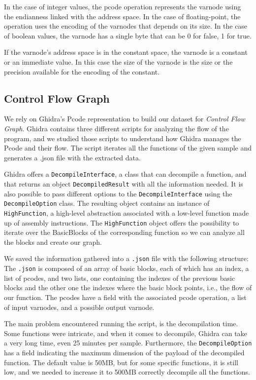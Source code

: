 In the case of integer values, the pcode operation represents the varnode using the endianness linked with the address space.
In the case of floating-point, the operation uses the encoding of the varnodes that depends on its size.
In the case of boolean values, the varnode has a single byte that can be 0 for false, 1 for true.

If the varnode's address space is in the constant space, the varnode is a constant or an immediate value. In this case the size of the varnode is the size or the precision available for the encoding of the constant.



\subsection{Control Flow Graph}
\label{subsec:cfg_ghidra}
We rely on Ghidra's Pcode representation to build our dataset for \textit{Control Flow Graph}. Ghidra contains three different scripts for analyzing the flow of the program, and we studied those scripts to understand how Ghidra manages the Pcode and their flow. The script iterates all the functions of the given sample and generates a .json file with the extracted data.

Ghidra offers a \texttt{DecompileInterface}, a class that can decompile a function, and that returns an object \texttt{DecompiledResult} with all the information needed. It is also possible to pass different options to the \texttt{DecompileInterface} using the \texttt{DecompileOption} class. The resulting object contains an instance of \texttt{HighFunction}, a high-level abstraction associated with a low-level function made up of assembly instructions. The \texttt{HighFunction} object offers the possibility to iterate over the BasicBlocks of the corresponding function so we can analyze all the blocks and create our graph.

We saved the information gathered into a \texttt{.json} file with the following structure:
The \texttt{.json} is composed of an array of basic blocks, each of which has an index, a list of pcodes, and two lists, one containing the indexes of the previous basic blocks and the other one the indexes where the basic block points, i.e., the flow of our function. The pcodes have a field with the associated pcode operation, a list of input varnodes, and a possible output varnode.

The main problem encountered running the script, is the decompilation time. Some functions were intricate, and when it comes to decompile, Ghidra can take a very long time, even 25 minutes per sample.  Furthermore, the \texttt{DecompileOption} has a field indicating the maximum dimension of the payload of the decompiled function. The default value is 50MB, but for some specific functions, it is still low, and we needed to increase it to 500MB correctly decompile all the functions.

